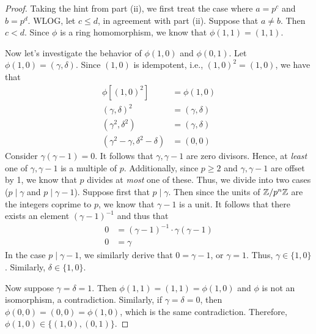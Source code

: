 \documentclass[../psets.tex]{subfiles}
\begin{document}
\begin{enumerate}
\begin{enumerate}
\begin{proof}




            Taking the hint from part (ii), we first treat the case where $a=p^c$ and $b=p^d$. WLOG, let $c\leq d$, in agreement with part (ii). Suppose that $a\neq b$. Then $c<d$. Since $\phi$ is a ring homomorphism, we know that $\phi(1,1)=(1,1)$.\par
            Now let's investigate the behavior of $\phi(1,0)$ and $\phi(0,1)$. Let $\phi(1,0)=(\gamma,\delta)$. Since $(1,0)$ is idempotent, i.e., $(1,0)^2=(1,0)$, we have that
            \begin{align*}
                \phi[(1,0)^2] &= \phi(1,0)\\
                (\gamma,\delta)^2 &= (\gamma,\delta)\\
                (\gamma^2,\delta^2) &= (\gamma,\delta)\\
                (\gamma^2-\gamma,\delta^2-\delta) &= (0,0)
            \end{align*}
            Consider $\gamma(\gamma-1)=0$. It follows that $\gamma,\gamma-1$ are zero divisors. Hence, at \emph{least} one of $\gamma,\gamma-1$ is a multiple of $p$. Additionally, since $p\geq 2$ and $\gamma,\gamma-1$ are offset by 1, we know that $p$ divides at \emph{most} one of these. Thus, we divide into two cases ($p\mid\gamma$ and $p\mid\gamma-1$). Suppose first that $p\mid\gamma$. Then since the units of $\mathbb{Z}/p^n\mathbb{Z}$ are the integers coprime to $p$, we know that $\gamma-1$ is a unit. It follows that there exists an element $(\gamma-1)^{-1}$ and thus that
            \begin{align*}
                0 &= (\gamma-1)^{-1}\cdot\gamma(\gamma-1)\\
                0 &= \gamma
            \end{align*}
            In the case $p\mid\gamma-1$, we similarly derive that $0=\gamma-1$, or $\gamma=1$. Thus, $\gamma\in\{1,0\}$. Similarly, $\delta\in\{1,0\}$.\par
            Now suppose $\gamma=\delta=1$. Then $\phi(1,1)=(1,1)=\phi(1,0)$ and $\phi$ is not an isomorphism, a contradiction. Similarly, if $\gamma=\delta=0$, then $\phi(0,0)=(0,0)=\phi(1,0)$, which is the same contradiction. Therefore, $\phi(1,0)\in\{(1,0),(0,1)\}$.\par

\end{proof}
\end{enumerate}
\end{enumerate}
\end{document}
